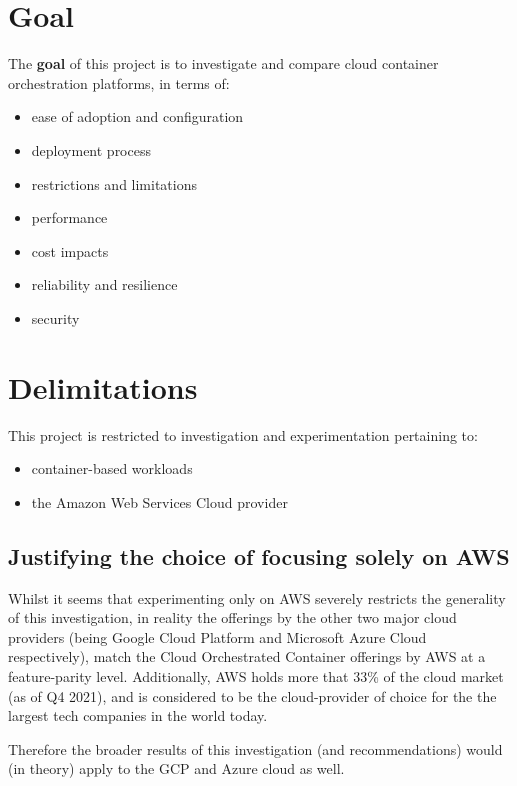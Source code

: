\section{Goal}
\noindent The \textbf{goal} of this project is to investigate and compare cloud container orchestration platforms, in terms of:
\begin{itemize}
  \item ease of adoption and configuration
  \item deployment process
  \item restrictions and limitations
  \item performance
  \item cost impacts
  \item reliability and resilience
  \item security
\end{itemize}

\section{Delimitations}
This project is restricted to investigation and experimentation pertaining to:
\begin{itemize}
  \item container-based workloads
  \item the Amazon Web Services Cloud provider
\end{itemize}

\subsection{Justifying the choice of focusing solely on AWS}
Whilst it seems that experimenting only on AWS severely restricts the generality of this investigation, in reality the offerings by the other two major cloud providers
(being Google Cloud Platform and Microsoft Azure Cloud respectively), match the Cloud Orchestrated Container offerings by AWS at a feature-parity level\cite{contaier_workloads}.
Additionally, AWS holds more that 33\% of the cloud market (as of Q4 2021)\cite{aws_cloud_share},
and is considered to be the cloud-provider of choice for the the largest tech companies in the world today\cite{aws_users}.

Therefore the broader results of this investigation (and recommendations) would (in theory) apply to the GCP and Azure cloud as well.

